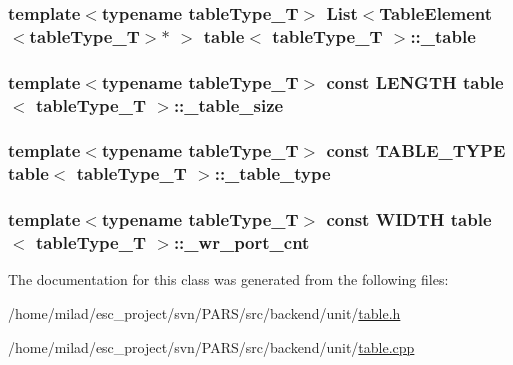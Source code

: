 \hypertarget{classtable_aea78e74d4f44c1879df0c44e69d7bc26}{
\subsubsection[{\_\-table}]{\setlength{\rightskip}{0pt plus 5cm}template$<$typename tableType\_\-T$>$ {\bf List}$<${\bf TableElement}$<$tableType\_\-T$>$$\ast$ $>$ {\bf table}$<$ tableType\_\-T $>$::{\bf \_\-table}}}
\label{classtable_aea78e74d4f44c1879df0c44e69d7bc26}
\hypertarget{classtable_a812d699882bfa6230532dad66a5004bd}{
\subsubsection[{\_\-table\_\-size}]{\setlength{\rightskip}{0pt plus 5cm}template$<$typename tableType\_\-T$>$ const {\bf LENGTH} {\bf table}$<$ tableType\_\-T $>$::{\bf \_\-table\_\-size}}}
\label{classtable_a812d699882bfa6230532dad66a5004bd}
\hypertarget{classtable_ae804042049b8e94591efe22ae05c0371}{
\subsubsection[{\_\-table\_\-type}]{\setlength{\rightskip}{0pt plus 5cm}template$<$typename tableType\_\-T$>$ const {\bf TABLE\_\-TYPE} {\bf table}$<$ tableType\_\-T $>$::{\bf \_\-table\_\-type}}}
\label{classtable_ae804042049b8e94591efe22ae05c0371}
\hypertarget{classtable_a8ce1d116f2fa5d7fd3d9177c2037cfb3}{
\subsubsection[{\_\-wr\_\-port\_\-cnt}]{\setlength{\rightskip}{0pt plus 5cm}template$<$typename tableType\_\-T$>$ const {\bf WIDTH} {\bf table}$<$ tableType\_\-T $>$::{\bf \_\-wr\_\-port\_\-cnt}}}
\label{classtable_a8ce1d116f2fa5d7fd3d9177c2037cfb3}


The documentation for this class was generated from the following files:\begin{DoxyCompactItemize}
\item 
/home/milad/esc\_\-project/svn/PARS/src/backend/unit/\hyperlink{table_8h}{table.h}\item 
/home/milad/esc\_\-project/svn/PARS/src/backend/unit/\hyperlink{table_8cpp}{table.cpp}\end{DoxyCompactItemize}
